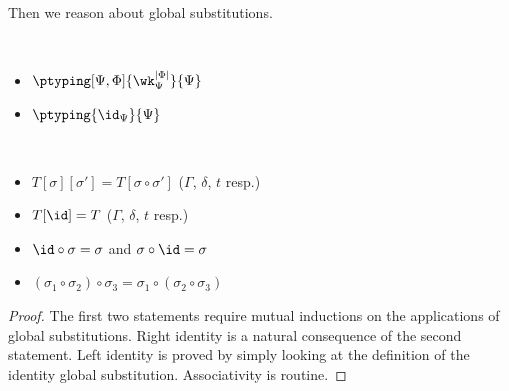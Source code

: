 Then we reason about global substitutions.
\begin{lemma} $ $
  \begin{itemize}
  \item $\ptyping[\Psi,\Phi] {\wk_{\Psi}^{|\Phi|}}{\Psi}$
  \item $\ptyping {\id_{\Psi}}{\Psi}$
  \end{itemize}
\end{lemma}
\begin{lemma} $ $
  \begin{itemize}
  \item $T[\sigma][\sigma'] = T[\sigma \circ \sigma']$ ($\Gamma$, $\delta$, $t$ resp.)
  \item $T[\id] = T$ ($\Gamma$, $\delta$, $t$ resp.)
  \item $\id \circ \sigma = \sigma$ and $\sigma \circ \id = \sigma$
  \item $(\sigma_1 \circ \sigma_2) \circ \sigma_3 = \sigma_1 \circ (\sigma_2 \circ \sigma_3)$
  \end{itemize}
\end{lemma}
\begin{proof}
  The first two statements require mutual inductions on the applications of global
  substitutions. %
  Right identity is a natural consequence of the second statement. %
  Left identity is proved by simply looking at the definition of the identity global
  substitution. %
  Associativity is routine. 
\end{proof}

